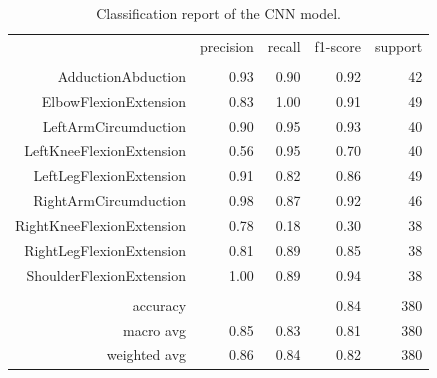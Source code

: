 \begin{table}[h!]
	\centering
	\caption{Classification report of the CNN model.}
	\label{tab:CNNreport}
	\begin{tabular}{rrrrr}
		\multicolumn{1}{l}{}      & precision            & recall               & f1-score             & support              \\
		\multicolumn{1}{l}{}      &                      &                      &                      &                      \\
		AdductionAbduction        & 0.93                 & 0.90                 & 0.92                 & 42                   \\
		ElbowFlexionExtension     & 0.83                 & 1.00                 & 0.91                 & 49                   \\
		LeftArmCircumduction      & 0.90                 & 0.95                 & 0.93                 & 40                   \\
		LeftKneeFlexionExtension  & 0.56                 & 0.95                 & 0.70                 & 40                   \\
		LeftLegFlexionExtension   & 0.91                 & 0.82                 & 0.86                 & 49                   \\
		RightArmCircumduction     & 0.98                 & 0.87                 & 0.92                 & 46                   \\
		RightKneeFlexionExtension & 0.78                 & 0.18                 & 0.30                 & 38                   \\
		RightLegFlexionExtension  & 0.81                 & 0.89                 & 0.85                 & 38                   \\
		ShoulderFlexionExtension  & 1.00                 & 0.89                 & 0.94                 & 38                   \\
		\multicolumn{1}{l}{}      & \multicolumn{1}{l}{} & \multicolumn{1}{l}{} & \multicolumn{1}{l}{} & \multicolumn{1}{l}{} \\
		accuracy                  &                      &                      & 0.84                 & 380                  \\
		macro avg                 & 0.85                 & 0.83                 & 0.81                 & 380                  \\
		weighted avg              & 0.86                 & 0.84                 & 0.82                 & 380
	\end{tabular}%
\end{table}

